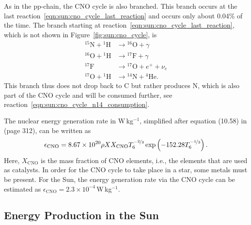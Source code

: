 As in the \ac{pp-chain}, the CNO cycle is also branched. This branch occurs at the last reaction~\eqref{eqn:sun:cno_cycle_last_reaction} and occurs only about 0.04\% of the time. The branch starting at reaction~\eqref{eqn:sun:cno_cycle_last_reaction}, which is not shown in Figure~\ref{fig:sun:cno_cycle}, is
\begin{align}
        {^{15}}\mathrm{N} + {^1}\mathrm{H} &\longrightarrow {^{16}}\mathrm{O} + \gamma\\
        {^{16}}\mathrm{O} + {^1}\mathrm{H} &\longrightarrow {^{17}}\mathrm{F} + \gamma\\
        {^{17}}\mathrm{F} &\longrightarrow {^{17}}\mathrm{O} + e^+ + \nu_e\\
        {^{17}}\mathrm{O} + {^1}\mathrm{H} &\longrightarrow {^{14}}\mathrm{N} + {^4}\mathrm{He}.
\end{align}
This branch thus does not drop back to C but rather produces N, which is also part of the CNO cycle and will be consumed further, see reaction~\eqref{eqn:sun:cno_cycle_n14_consumption}.

The nuclear energy generation rate in W\,kg$^{-1}$, simplified after equation (10.58) in \citet{carroll17} (page 312), can be written as
\begin{equation}
    \epsilon_\mathrm{CNO} = 8.67\times 10^{20} \rho X X_\mathrm{CNO} T_6^{-\nicefrac{2}{3}} \exp\left(-152.28 T_6^{-\nicefrac{1}{3}}\right). \label{eqn:sun:energy_generation_cno_cycle}
\end{equation}
Here, $X_\mathrm{CNO}$ is the mass fraction of CNO elements, i.e., the elements that are used as catalysts. In order for the CNO cycle to take place in a star, some metals must be present. For the Sun, the energy generation rate via the CNO cycle can be estimated as $\epsilon_\mathrm{CNO} = 2.3\times10^{-4}$\,W\,kg$^{-1}$.


\subsection{Energy Production in the Sun}

